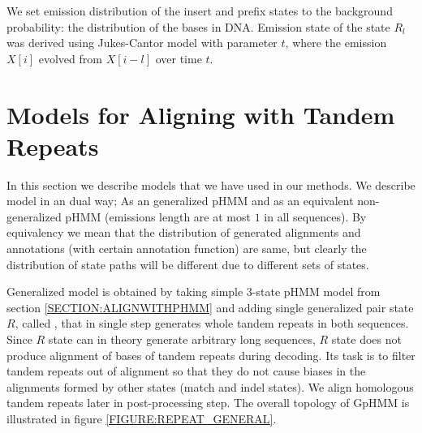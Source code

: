 We set emission distribution of the insert and prefix states to the background
probability: the distribution of the bases in DNA. Emission state of the state
$R_l$ was derived using Jukes-Cantor model with parameter $t$, where the
emission $X[i]$ evolved from $X[i-l]$ over time $t$.

\section{Models for Aligning with Tandem Repeats}\label{SECTION:REPMODELS}
In this section we describe models that we have used in our methods. We
describe model in an dual way; As an generalized pHMM and as an equivalent
non-generalized pHMM (emissions length are at most $1$ in all sequences).  By
equivalency we mean that the distribution of generated alignments and
annotations (with certain annotation function) are same, but clearly the
distribution of state paths will be different due to different sets of
states.

Generalized model is obtained by taking simple 3-state pHMM model from section
\ref{SECTION:ALIGNWITHPHMM} and adding single generalized pair state $R$,
called , that in single step generates whole tandem
repeats in both sequences. Since $R$ state can in theory generate arbitrary
long sequences, $R$ state does not produce alignment of bases of tandem repeats
during decoding. Its task is to filter tandem repeats out of alignment so that
they do not cause biases in the alignments formed by other states (match and
indel states). We align homologous tandem repeats later in post-processing
step. The overall topology of GpHMM is illustrated in figure
\ref{FIGURE:REPEAT_GENERAL}.


